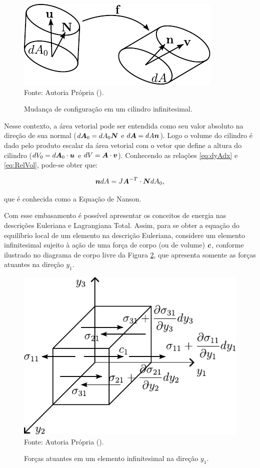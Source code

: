 \begin{figure}[h!]
    \centering
    \caption{Mudança de configuração em um cilindro infinitesimal.}
    \includegraphics[width=.45\linewidth]{Figuras/Nanson.pdf}
    \\Fonte: Autoria Própria (\the\year).
    \label{fig:Nanson}
\end{figure}

Nesse contexto, a área vetorial pode ser entendida como seu valor absoluto na direção de sua normal ($d\boldsymbol{A}_0=dA_0\boldsymbol{N}$ e $d\boldsymbol{A}=dA\boldsymbol{n}$). Logo o volume do cilindro é dado pelo produto escalar da área vetorial com o vetor que define a altura do cilindro ($dV_0=d\boldsymbol{A}_0\cdot\boldsymbol{u}$ e $dV=\boldsymbol{A}\cdot\boldsymbol{v}$). Conhecendo as relações \eqref{eq:dyAdx} e \eqref{eq:RelVol}, pode-se obter que:

\begin{equation}
    \boldsymbol{n}dA=J\boldsymbol{A}^{-T}\cdot\boldsymbol{N}dA_0\text{,}\label{eq:Nanson}
\end{equation}

\noindent que é conhecida como a Equação de Nanson.

Com esse embasamento é possível apresentar os conceitos de energia nas descrições Euleriana e Lagrangiana Total. Assim, para se obter a equação do equilíbrio local de um elemento na descrição Euleriana, considere um elemento infinitesimal sujeito à ação de uma força de corpo (ou de volume) $\boldsymbol{c}$, conforme ilustrado no diagrama de corpo livre da Figura \ref{fig:CorpoLivreSolido}, que apresenta somente as forças atuantes na direção $y_1$.

\begin{figure}[h!]
    \centering
    \caption{Forças atuantes em um elemento infinitesimal na direção $y_1$.}
    \includegraphics[width=.5\linewidth]{Figuras/CorpoLivreSolido.pdf}
    \\Fonte: Autoria Própria (\the\year).
    \label{fig:CorpoLivreSolido}
\end{figure}

